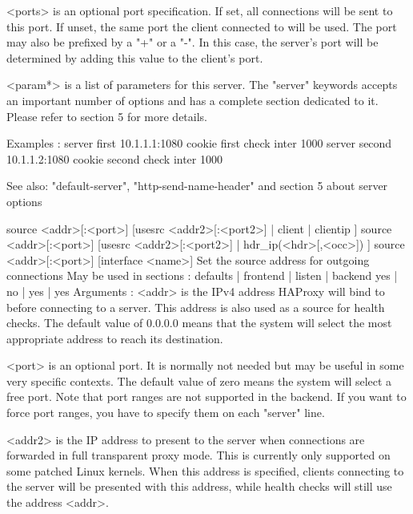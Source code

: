     <ports>   is an optional port specification. If set, all connections will
              be sent to this port. If unset, the same port the client
              connected to will be used. The port may also be prefixed by a "+"
              or a "-". In this case, the server's port will be determined by
              adding this value to the client's port.

    <param*>  is a list of parameters for this server. The "server" keywords
              accepts an important number of options and has a complete section
              dedicated to it. Please refer to section 5 for more details.

  Examples :
        server first  10.1.1.1:1080 cookie first  check inter 1000
        server second 10.1.1.2:1080 cookie second check inter 1000

  See also: "default-server", "http-send-name-header" and section 5 about
             server options


source <addr>[:<port>] [usesrc { <addr2>[:<port2>] | client | clientip } ]
source <addr>[:<port>] [usesrc { <addr2>[:<port2>] | hdr_ip(<hdr>[,<occ>]) } ]
source <addr>[:<port>] [interface <name>]
  Set the source address for outgoing connections
  May be used in sections :   defaults | frontend | listen | backend
                                 yes   |    no    |   yes  |   yes
  Arguments :
    <addr>    is the IPv4 address HAProxy will bind to before connecting to a
              server. This address is also used as a source for health checks.
              The default value of 0.0.0.0 means that the system will select
              the most appropriate address to reach its destination.

    <port>    is an optional port. It is normally not needed but may be useful
              in some very specific contexts. The default value of zero means
              the system will select a free port. Note that port ranges are not
              supported in the backend. If you want to force port ranges, you
              have to specify them on each "server" line.

    <addr2>   is the IP address to present to the server when connections are
              forwarded in full transparent proxy mode. This is currently only
              supported on some patched Linux kernels. When this address is
              specified, clients connecting to the server will be presented
              with this address, while health checks will still use the address
              <addr>.

